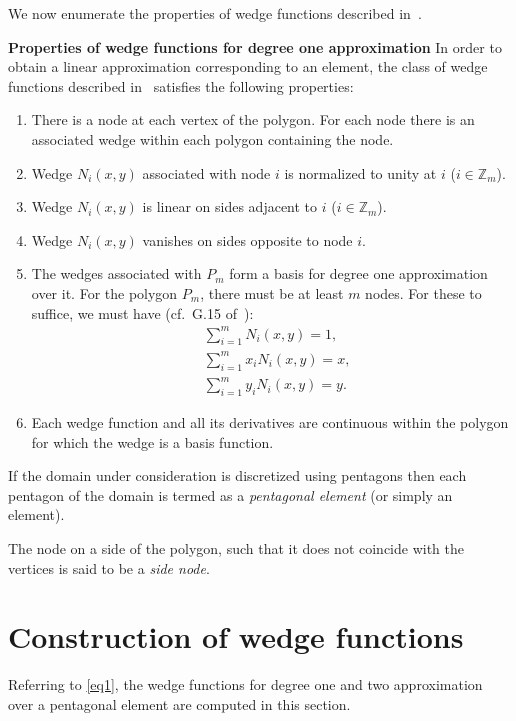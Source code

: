 \documentclass[automatic-bibliography]{univsciauth}
\begin{document}
We now enumerate the properties of wedge functions described in~\cite{wachs}.

\textbf{Properties of wedge functions for degree one approximation}\:\cite{wachs}
In order to obtain a linear approximation corresponding to an element, the class
of wedge functions described in~\cite{wachs} satisfies the following properties:
\begin{enumerate}
  \item There is a node at each vertex of the polygon. For each node there is an
        associated wedge within each polygon containing the node.
  \item Wedge $N_i(x,y)$ associated with node $i$ is normalized to unity at $i$
        ($i\in\mathbb{Z}_m$).
  \item Wedge $N_i(x,y)$ is linear on sides adjacent to $i$
        ($i\in\mathbb{Z}_m$).
  \item{\label{4_2}} Wedge $N_i(x,y)$ vanishes on sides opposite to node
        $i$.
  \item{\label{5_2}} The wedges associated with $P_m$ form a basis for
        degree one approximation over it. For the polygon $P_m$, there must be at least
        $m$ nodes. For these to suffice, we must have (cf.~G.15 of~\cite{das1}):
        \begin{align}
          &\sum_{i=1}^{m}N_i(x,y) = 1, \label{2.1_1}\\
          &\sum_{i=1}^{m}x_iN_i(x,y) = x,\\
          &\sum_{i=1}^{m}y_iN_i(x,y) = y.
        \end{align}
  \item Each wedge function and all its derivatives are continuous within the polygon
        for which the wedge is a basis function.
\end{enumerate}

\begin{definition}
  If the domain under consideration is discretized using pentagons then each
  pentagon of the domain is termed as a \emph{pentagonal element} (or simply an
  element).
\end{definition}

\begin{definition}
  The node on a side of the polygon, such that it does not coincide with
  the vertices is said to be a \emph{side node}.
\end{definition}

\section{Construction of wedge functions}\label{sec3}
Referring to \autoref{eq1}, the wedge functions for degree one and two
approximation over a pentagonal element are  computed in this section.
\end{document}
